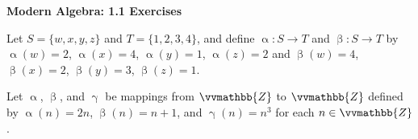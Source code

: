 \documentclass{exam}
\begin{document}
\textbf{Modern Algebra: 1.1 Exercises}

\begin{questions}
    \question Let \( S = \{ w, x, y, z \} \) and \( T = \{ 1, 2, 3, 4 \} \), and define \( \upalpha \colon S \to T \) and \( \upbeta \colon S \to T \) by \( \upalpha \left( w \right) = 2 \), \( \upalpha \left( x \right) = 4 \), \( \upalpha \left( y \right) = 1 \), \( \upalpha \left( z \right) = 2 \) and \( \upbeta \left( w \right) = 4 \), \( \upbeta \left( x \right) = 2 \), \( \upbeta \left( y \right) = 3 \), \( \upbeta \left( z \right) = 1 \).


    \vspace{1.2cm}

    \question Let \( \upalpha \), \( \upbeta \), and \( \upgamma \) be mappings from \( \vvmathbb{Z} \) to \( \vvmathbb{Z} \) defined by \( \upalpha \left( n \right) = 2n \), \( \upbeta \left( n \right) = n + 1 \), and \( \upgamma \left( n \right) = n^3 \) for each \( n \in \vvmathbb{Z} \).



\end{questions}
\end{document}
